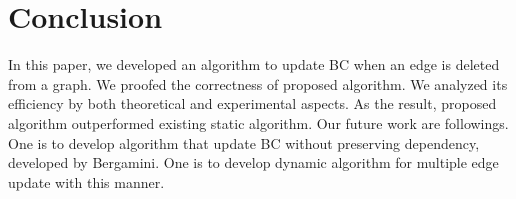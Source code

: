 \documentclass{article}
\begin{document}


\section{Conclusion}
In this paper, we developed an algorithm to update BC when an edge is deleted from a graph.
We proofed the correctness of proposed algorithm.
We analyzed its efficiency by both theoretical and experimental aspects.
As the result, proposed algorithm outperformed existing static algorithm.
Our future work are followings.
One is to develop algorithm that update BC without preserving dependency, developed by Bergamini\cite{Bergamini2017}.
One is to develop dynamic algorithm for multiple edge update with this manner.

{
  \linespread{1.0}
  \printbibliography[title=References]
}

\appendix

{
  \linespread{1.0}
  
}


\end{document}

